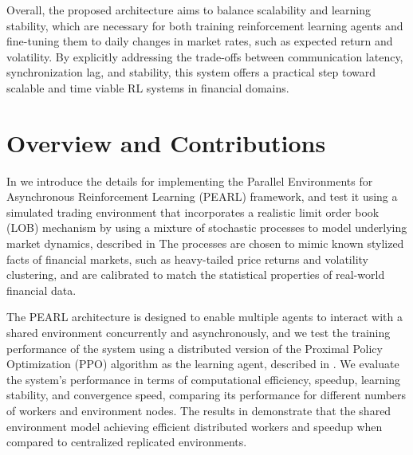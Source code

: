 Overall, the proposed architecture aims to balance scalability and learning stability,
which are necessary for both training reinforcement learning agents and fine-tuning them to daily changes
in market rates, such as expected return and volatility.
By explicitly addressing the trade-offs between communication latency, synchronization lag, and stability,
this system offers a practical step toward scalable and time viable RL systems in financial domains.

\section{Overview and Contributions}
\label{sec:overview}

In  we introduce the details for implementing the Parallel Environments for Asynchronous Reinforcement Learning (PEARL) framework,
and test it using a simulated trading environment that incorporates a realistic limit order book (LOB) mechanism
by using a mixture of stochastic processes to model underlying market dynamics, described in 
The processes are chosen to mimic known stylized facts of financial markets, such as heavy-tailed price returns and
volatility clustering, and are calibrated to match the statistical properties of real-world financial data.

The PEARL architecture is designed to enable multiple agents to interact with a shared environment concurrently and asynchronously,
and we test the training performance of the system using a distributed version of the Proximal Policy Optimization (PPO) algorithm
as the learning agent, described in .
We evaluate the system's performance in terms of computational efficiency, speedup, learning stability, and convergence speed,
comparing its performance for different numbers of workers and environment nodes.
The results in  demonstrate that the shared environment model
achieving efficient distributed workers and speedup when compared to centralized replicated environments.
